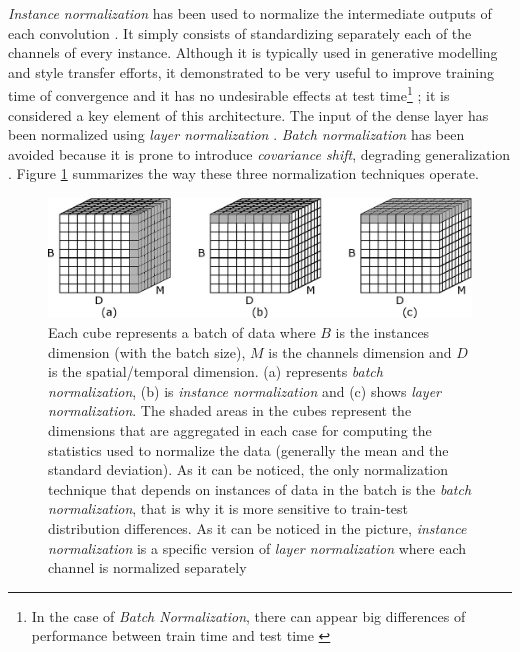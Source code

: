 \documentclass{elsarticle}
\begin{document}
\textit{Instance normalization}  has been used to normalize the intermediate outputs of each convolution \cite{Ulyanov2016, Zheng2018}. It simply consists of standardizing separately each of the channels of every instance. Although it is typically used in generative modelling and style transfer efforts, it demonstrated to be very useful to improve training time of convergence and it has no undesirable effects at test time\footnote{In the case of \textit{Batch Normalization}, there can appear big differences of performance between train time and test time \cite{Ba2016}} \cite{Ulyanov2016}; it is considered a key element of this architecture. The input of the dense layer has been normalized using \textit{layer normalization} \cite{Ba2016}. \textit{Batch normalization} \cite{Ioffe2015} has been avoided because it is prone to introduce \textit{covariance shift}, degrading generalization \cite{Ba2016}. Figure \ref{fig:normcubes} summarizes the way these three normalization techniques operate.



\begin{figure}[ht]
	\centering
	\includegraphics[width=0.7\linewidth]{img/normcubes}
	\caption{Each cube represents a batch of data where $B$ is the instances dimension (with the batch size), $M$ is the channels dimension and $D$ is the spatial/temporal dimension. (a) represents \textit{batch normalization}, (b) is \textit{instance normalization} and (c) shows \textit{layer normalization}. The shaded areas in the cubes represent the dimensions that are aggregated in each case for computing the statistics used to normalize the data (generally the mean and the standard deviation). As it can be noticed, the only normalization technique that depends on instances of data in the batch is the \textit{batch normalization}, that is why it is more sensitive to train-test distribution differences. As it can be noticed in the picture, \textit{instance normalization} is a specific version of \textit{layer normalization} where each channel is normalized separately}
	\label{fig:normcubes}
\end{figure}
\end{document}
